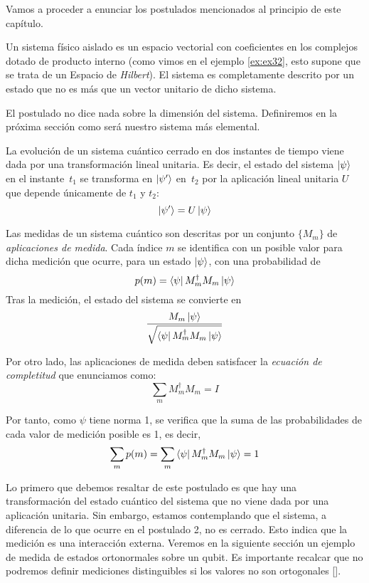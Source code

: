 Vamos a proceder a enunciar los postulados mencionados al principio de este capítulo.

\begin{postulate} Un sistema físico aislado es un espacio vectorial con coeficientes en los complejos dotado de producto interno (como vimos en el ejemplo \ref{ex:ex32}, esto supone que se trata de un Espacio de \textit{Hilbert}). El sistema es completamente descrito por un estado que no es más que un vector unitario de dicho sistema.
\end{postulate}

El postulado no dice nada sobre la dimensión del sistema. Definiremos en la próxima sección como será nuestro sistema más elemental.

\begin{postulate} La evolución de un sistema cuántico cerrado en dos instantes de tiempo viene dada por una transformación lineal unitaria. Es decir, el estado del sistema $\left|\psi\right\rangle$ en el instante~$t_1$ se transforma en $\left|\psi'\right\rangle$ en~$t_2$ por la aplicación lineal unitaria $U$ que depende únicamente de $t_1$ y $t_2$:
\[\left|\psi'\right\rangle=U\left|\psi\right\rangle\]
\end{postulate}

\begin{postulate} Las medidas de un sistema cuántico son descritas por un conjunto $\{M_m \}$ de \textit{aplicaciones de medida}. Cada índice $m$ se identifica con un posible valor para dicha medición que ocurre, para un estado $\left|\psi\right\rangle$, con una probabilidad de 
\[p(m)=\left\langle\psi\right|M_m^\dag M_m\left|\psi\right\rangle\]
%
Tras la medición, el estado del sistema se convierte en
\[\dfrac{M_m\left|\psi\right\rangle}{\sqrt{\left\langle\psi\right|M_m^\dag M_m\left|\psi\right\rangle}}\]

Por otro lado, las aplicaciones de medida deben satisfacer la \textit{ecuación de completitud} que enunciamos como:
\[\sum_m M_m^\dag M_m = I\]

Por tanto, como $\psi$ tiene norma 1, se verifica que la suma de las probabilidades de cada valor de medición posible es 1, es decir,
\[\sum_m p(m)=\sum_m \left\langle\psi\right|M_m^\dag M_m\left|\psi\right\rangle = 1\]
\end{postulate}

Lo primero que debemos resaltar de este postulado es que hay una transformación del estado cuántico del sistema que no viene dada por una aplicación unitaria. Sin embargo, estamos contemplando que el sistema, a diferencia de lo que ocurre en el postulado 2,  no es cerrado. Esto indica que la medición es una interacción externa. Veremos en la siguiente sección un ejemplo de medida de estados ortonormales sobre un qubit. Es importante recalcar que no podremos definir mediciones distinguibles si los valores no son ortogonales [\cite[p.~87]{nielsen2001quantum}]. 

